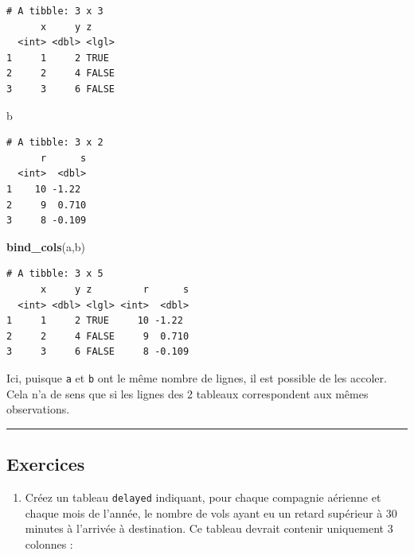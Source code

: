 \documentclass[a4paperpaper,]{article}
\newenvironment{Shaded}{\begin{snugshade}}{\end{snugshade}}
\newcommand{\KeywordTok}[1]{\textcolor[rgb]{0.12,0.11,0.11}{\textbf{#1}}}
\newcommand{\NormalTok}[1]{\textcolor[rgb]{0.12,0.11,0.11}{#1}}
\providecommand{\tightlist}{%
  \setlength{\itemsep}{0pt}\setlength{\parskip}{0pt}}
\theoremstyle{definition}
\theoremstyle{definition}
\theoremstyle{definition}
\theoremstyle{remark}
\begin{document}
\begin{verbatim}
# A tibble: 3 x 3
      x     y z    
  <int> <dbl> <lgl>
1     1     2 TRUE 
2     2     4 FALSE
3     3     6 FALSE
\end{verbatim}

\begin{Shaded}
\begin{Highlighting}[]
\NormalTok{b}
\end{Highlighting}
\end{Shaded}

\begin{verbatim}
# A tibble: 3 x 2
      r      s
  <int>  <dbl>
1    10 -1.22 
2     9  0.710
3     8 -0.109
\end{verbatim}

\begin{Shaded}
\begin{Highlighting}[]
\KeywordTok{bind_cols}\NormalTok{(a,b)}
\end{Highlighting}
\end{Shaded}

\begin{verbatim}
# A tibble: 3 x 5
      x     y z         r      s
  <int> <dbl> <lgl> <int>  <dbl>
1     1     2 TRUE     10 -1.22 
2     2     4 FALSE     9  0.710
3     3     6 FALSE     8 -0.109
\end{verbatim}

Ici, puisque \texttt{a} et \texttt{b} ont le même nombre de lignes, il
est possible de les accoler. Cela n'a de sens que si les lignes des 2
tableaux correspondent aux mêmes observations.

\begin{center}\rule{0.5\linewidth}{\linethickness}\end{center}

\hypertarget{exercices-11}{%
\subsection{Exercices}\label{exercices-11}}

\begin{enumerate}
\def\labelenumi{\arabic{enumi}.}
\tightlist
\item
  Créez un tableau \texttt{delayed} indiquant, pour chaque compagnie
  aérienne et chaque mois de l'année, le nombre de vols ayant eu un
  retard supérieur à 30 minutes à l'arrivée à destination. Ce tableau
  devrait contenir uniquement 3 colonnes :
\end{enumerate}
\end{document}
